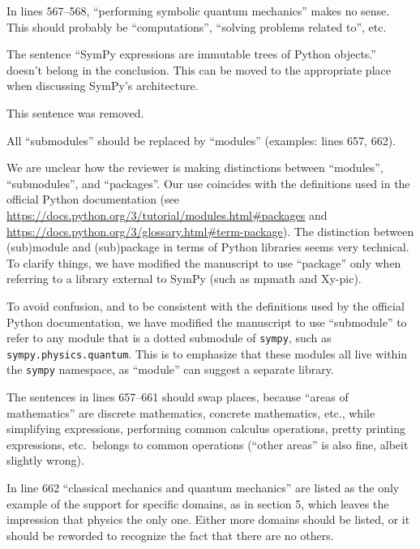 \documentclass[answers,12pt]{exam}
\begin{document}
\begin{questions}
\question In lines 567--568, ``performing symbolic quantum mechanics'' makes no sense. This should probably be ``computations'', ``solving problems related to'', etc.
\begin{solution}

\end{solution}

\question The sentence ``SymPy expressions are immutable trees of Python objects.'' doesn't belong in the conclusion. This can be moved to the appropriate place when discussing SymPy's architecture.
\begin{solution}
This sentence was removed.
\end{solution}

\question All ``submodules'' should be replaced by ``modules'' (examples:
lines 657, 662).
\label{rev1point37}
\begin{solution}
We are unclear how the reviewer is making distinctions between ``modules'',
``submodules'', and ``packages''. Our use coincides with the definitions used
in the official Python documentation (see
\url{https://docs.python.org/3/tutorial/modules.html#packages} and
\url{https://docs.python.org/3/glossary.html#term-package}). The distinction
between (sub)module and (sub)package in terms of Python libraries seems very
technical. To clarify things, we have modified the manuscript to use
``package'' only when referring to a library external to SymPy (such as
mpmath and Xy-pic).

To avoid confusion, and to be consistent with the definitions used by the
official Python documentation, we have modified the manuscript to use
``submodule'' to refer to any module that is a dotted submodule of
\texttt{sympy}, such as \texttt{sympy.physics.quantum}. This is to emphasize
that these modules all live within the \texttt{sympy} namespace, as ``module''
can suggest a separate library.
\end{solution}

\question The sentences in lines 657--661 should swap places, because ``areas of mathematics'' are discrete mathematics, concrete mathematics, etc., while simplifying expressions, performing common calculus operations, pretty printing expressions, etc.\ belongs to common operations (``other areas'' is also fine, albeit slightly wrong).
\begin{solution}

\end{solution}

\question In line 662 ``classical mechanics and quantum mechanics'' are listed as the only example of the support for specific domains, as in section 5, which leaves the impression that physics the only one. Either more domains should be listed, or it should be reworded to recognize the fact that there are no others.
\begin{solution}


\end{solution}
\end{questions}
\end{document}
